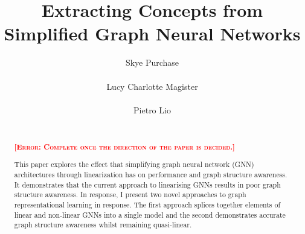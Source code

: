 \documentclass{article}
\title[Extracting Concepts from Simplified Graph Neural Networks]{Extracting Concepts from Simplified Graph Neural Networks}
\author[S. Purchase et al.]{%
Skye Purchase\\
\institute{University of Cambridge}\\
\email{skyepurchase@gmail.com}\And
Lucy Charlotte Magister\\
\institute{University of Cambridge}\\
\email{Fillin}\And
Pietro Lio\\
\institute{University of Cambridge}\\
\email{Fillin}
}
\newcommand\error[1]{\textcolor{red}{\textsc{\textbf{[Error: #1]}}}}
\begin{document}


\maketitle

\begin{abstract}
    \error{Complete once the direction of the paper is decided.}

    This paper explores the effect that simplifying graph neural network (GNN) architectures through linearization has on performance and graph structure awareness.
    It demonstrates that the current approach to linearising GNNs results in poor graph structure awareness. In response, I present two novel approaches to graph representational learning in response.
    The first approach splices together elements of linear and non-linear GNNs into a single model and the second demonstrates accurate graph structure awareness whilst remaining quasi-linear.

\end{abstract}





\end{document}
